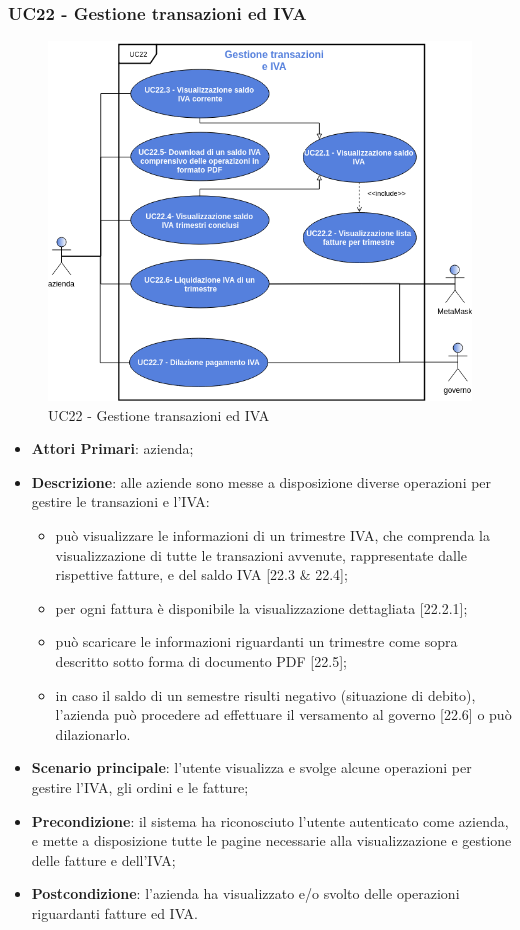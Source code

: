 \subsubsection{UC22 - Gestione transazioni ed IVA}
\begin{figure}[H]
	\includegraphics[width=12cm]{res/images/UC22.png}
	\centering
	\caption{UC22 - Gestione transazioni ed IVA}
\end{figure}
\begin{itemize}
	\item \textbf{Attori Primari}: azienda;
	\item \textbf{Descrizione}: alle aziende sono messe a disposizione diverse operazioni per gestire le transazioni e l'IVA:
	\begin{itemize}
		\item può visualizzare le informazioni di un trimestre IVA, che comprenda la visualizzazione di tutte le transazioni avvenute, rappresentate dalle rispettive fatture, e del saldo IVA [22.3 \& 22.4];
		\item per ogni fattura è disponibile la visualizzazione dettagliata [22.2.1];
		\item può scaricare le informazioni riguardanti un trimestre come sopra descritto sotto forma di documento PDF [22.5]; 
		\item in caso il saldo di un semestre risulti negativo (situazione di debito), l'azienda può procedere ad effettuare il versamento al governo [22.6] o può dilazionarlo\glosp [22.7].
	\end{itemize}
	\item \textbf{Scenario principale}: l'utente visualizza e svolge alcune operazioni per gestire l'IVA, gli ordini e le fatture;
	\item \textbf{Precondizione}: il sistema ha riconosciuto l'utente autenticato come azienda, e mette a disposizione tutte le pagine necessarie alla visualizzazione e gestione delle fatture e dell'IVA;
	\item \textbf{Postcondizione}: l'azienda ha visualizzato e/o svolto delle operazioni riguardanti fatture ed IVA.
\end{itemize} 
